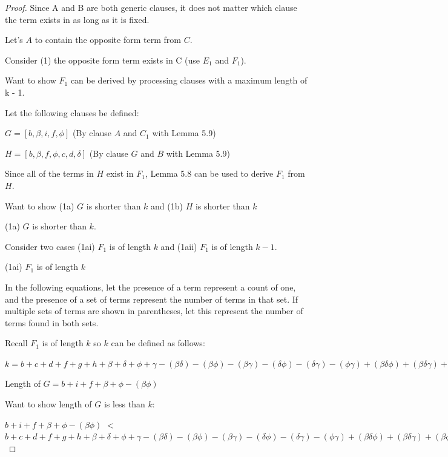 \documentclass[manuscript]{acmart}
\begin{document}
\begin{proof}
        Since A and B are both generic clauses, it does not matter which clause the term exists in as long as it is fixed.
        
        Let's $A$ to contain the opposite form term from $C$.
        
        Consider (1) the opposite form term exists in C (use $E_1$ and $F_1$).

        Want to show $F_1$ can be derived by processing clauses with a maximum length of k - 1.

        Let the following clauses be defined:

        $G = [b, \beta, i, f, \phi]$ (By clause $A$ and $C_1$ with Lemma 5.9)

        $H = [b, \beta, f, \phi, c, d, \delta]$ (By clause $G$ and $B$ with Lemma 5.9)

        Since all of the terms in $H$ exist in $F_1$, Lemma 5.8 can be used to derive $F_1$ from $H$.

        Want to show (1a) $G$ is shorter than $k$ and (1b) $H$ is shorter than $k$

        (1a) $G$ is shorter than $k$.

        Consider two cases (1ai) $F_1$ is of length $k$ and (1aii) $F_1$ is of length $k-1$.

        (1ai) $F_1$ is of length $k$

        In the following equations, let the presence of a term represent a count of one, and the presence of a set of terms represent the number of terms in that set. If multiple sets of terms are shown in parentheses, let this represent the number of terms found in both sets.
        
        Recall $F_1$ is of length $k$ so $k$ can be defined as follows:
        
        $k = b + c + d + f + g + h 
        + \beta + \delta + \phi + \gamma
        - (\beta \delta) - (\beta \phi) - (\beta \gamma) - (\delta \phi) - (\delta \gamma) - (\phi \gamma)
        + (\beta \delta \phi) + (\beta \delta \gamma) + (\beta \phi \gamma) + (\delta \phi \gamma)
        - (\beta \delta \phi \gamma)
        $

        Length of $G = b + i + f + \beta + \phi - (\beta \phi)$

        Want to show length of $G$ is less than $k$:

        $b + i + f + \beta + \phi - (\beta \phi)$
        $<$
        $b + c + d + f + g + h 
        + \beta + \delta + \phi + \gamma
        - (\beta \delta) - (\beta \phi) - (\beta \gamma) - (\delta \phi) - (\delta \gamma) - (\phi \gamma)
        + (\beta \delta \phi) + (\beta \delta \gamma) + (\beta \phi \gamma) + (\delta \phi \gamma)
        - (\beta \delta \phi \gamma) 
        $


\end{proof}
\end{document}
